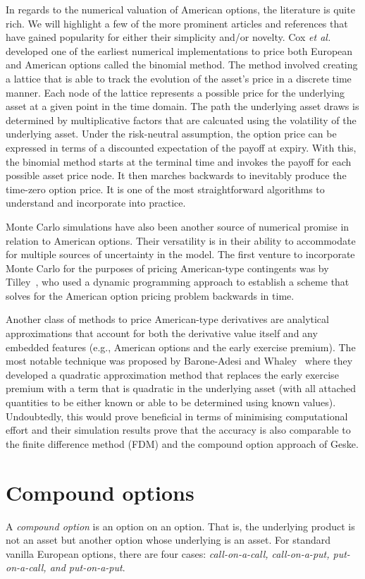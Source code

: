 In regards to the numerical valuation of American options, the literature is quite rich. We will highlight a few of the more prominent articles and references that have gained popularity for either their simplicity and/or novelty. Cox \emph{et al.}~\cite{Cox1979} developed one of the earliest numerical implementations to price both European and American options called the binomial method. The method involved creating a lattice that is able to track the evolution of the asset's price in a discrete time manner. Each node of the lattice represents a possible price for the underlying asset at a given point in the time domain. The path the underlying asset draws is determined by multiplicative factors that are calcuated using the volatility of the underlying asset. Under the risk-neutral assumption, the option price can be expressed in terms of a discounted expectation of the payoff at expiry. With this, the binomial method starts at the terminal time and invokes the payoff for each possible asset price node. It then marches backwards to inevitably produce the time-zero option price. It is one of the most straightforward algorithms to understand and incorporate into practice.

Monte Carlo simulations have also been another source of numerical promise in relation to American options. Their versatility is in their ability to accommodate for multiple sources of uncertainty in the model. The first venture to incorporate Monte Carlo for the purposes of pricing American-type contingents was by Tilley~\cite{Tilley1993}, who used a dynamic programming approach to establish a scheme that solves for the American option pricing problem backwards in time.

Another class of methods to price American-type derivatives are analytical approximations that account for both the derivative value itself and any embedded features (e.g., American options and the early exercise premium). The most notable technique was proposed by Barone-Adesi and Whaley~\cite{Barone1987} where they developed a quadratic approximation method that replaces the early exercise premium with a term that is quadratic in the underlying asset (with all attached quantities to be either known or able to be determined using known values). Undoubtedly, this would prove beneficial in terms of minimising computational effort and their simulation results prove that the accuracy is also comparable to the finite difference method (FDM) and the compound option approach of Geske. 
	
\section{Compound options}
	A \emph{compound option} is an option on an option. That is, the underlying product is not an asset but another option whose underlying is an asset. For standard vanilla European options, there are four cases: \emph{call-on-a-call, call-on-a-put, put-on-a-call, and put-on-a-put}.

